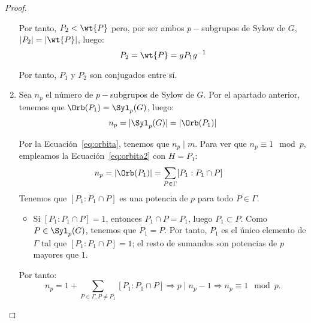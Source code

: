 \begin{ejercicio}
\begin{teo}
\begin{proof}
\begin{enumerate}
                Por tanto, $P_2<\wt{P}$ pero, por ser ambos \(p-\)subgrupos de Sylow de \(G\), $|P_2|=|\wt{P}|$, luego:
                \begin{equation*}
                    P_2 = \wt{P} = gP_1g^{-1}
                \end{equation*}
                
                Por tanto, $P_1$ y \(P_2\) son conjugados entre sí.

                \item Sea \(n_p\) el número de \(p-\)subgrupos de Sylow de \(G\). Por el apartado anterior, tenemos que $\Orb(P_1)=\Syl_p(G)$, luego:
                \begin{equation*}
                    n_p = |\Syl_p(G)| = |\Orb(P_1)|
                \end{equation*}

                Por la Ecuación~\eqref{eq:orbita}, tenemos que $n_p\mid m$. Para ver que \(n_p \equiv 1 \mod p\), empleamos la Ecuación~\eqref{eq:orbita2} con $H=P_1$:
                \begin{align*}
                    n_p &= |\Orb(P_1)| = \sum_{P\in \Gamma} [P_1:P_1\cap P]
                \end{align*}
                Tenemos que $[P_1:P_1\cap P]$ es una potencia de \(p\) para todo \(P\in \Gamma\).
                \begin{itemize}
                    \item Si $[P_1:P_1\cap P] = 1$, entonces \(P_1\cap P = P_1\), luego \(P_1\subset P\). Como $P\in \Syl_p(G)$, tenemos que \(P_1 = P\). Por tanto, \(P_1\) es el único elemento de \(\Gamma\) tal que $[P_1:P_1\cap P] = 1$; el resto de sumandos son potencias de \(p\) mayores que \(1\).
                \end{itemize}
                Por tanto:
                \begin{equation*}
                    n_p = 1 + \sum_{P\in \Gamma, P\neq P_1} [P_1:P_1\cap P]
                    \Longrightarrow p\mid n_p-1
                    \Longrightarrow n_p \equiv 1 \mod p.
                \end{equation*}
            \end{enumerate}
        \end{proof}
    \end{teo}
\end{ejercicio}

